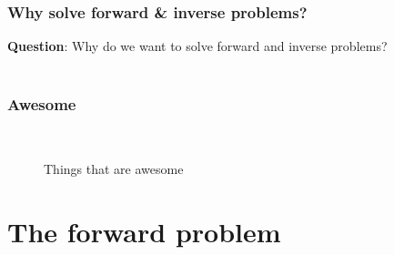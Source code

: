 \documentclass[10pt, compress]{beamer}
\begin{document}
\begin{frame}[fragile] \frametitle{Why solve forward \& inverse problems?}
    \begin{figure}
        \centering
        
    \end{figure}
    
    \vspace{5mm}
    
    \textbf{Question}: Why do we want to solve forward and inverse problems? \\ \\
\end{frame}

\begin{frame}[fragile] \frametitle{Awesome}
    \begin{figure}[!ht]
        \centering
        \quad
        \\
        \quad
        \caption{Things that are awesome}
    \end{figure}
\end{frame}

\section{The forward problem}
\end{document}
